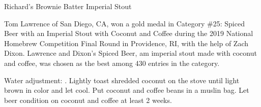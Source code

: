 \begin{recipie}{Richard's Brownie Batter Imperial Stout}

\begin{aboutblock}
Tom Lawrence of San Diego, CA, won a gold medal in Category \#25: Spiced Beer with
an Imperial Stout with Coconut and Coffee during the 2019 National Homebrew Competition
Final Round in Providence, RI, with the help of Zach Dixon. Lawrence and Dixon's Spiced
Beer, am imperial stout made with coconut and coffee, was chosen as the best among 430
entries in the category. \sourceaha
\end{aboutblock}


\begin{methodandtiming}
 
\begin{mashsteps}
\end{mashsteps}

\begin{fermentationsteps}
\end{fermentationsteps}

\begin{directions}
Water adjustment: . Lightly toast shredded
coconut on the stove until light brown in color and let cool. Put coconut and
coffee beans in a muslin bag. Let beer condition on coconut and coffee at least
2 weeks.
\end{directions}

\end{methodandtiming}

\pagebreak

\begin{ingredientsblock}

\begin{malts}
\end{malts}


\end{ingredientsblock}
\end{recipie}
